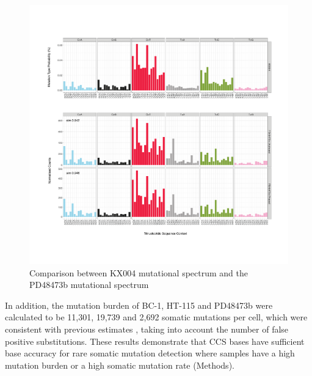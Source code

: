 \begin{figure}[htbp!]
\caption{Comparison between KX004 mutational spectrum and the PD48473b mutational spectrum}
\label{figure:PD48473b}
\includegraphics[width=\textwidth]{Vector/hg19.KX001.PD48473b.pdf}
\end{figure}

In addition, the mutation burden of BC-1, HT-115 and PD48473b were calculated to be 11,301,  19,739 and 2,692 somatic mutations per cell, which were consistent with previous estimates \cite{Mitchell2022-ry, Petljak2019-wi}, taking into account the number of false positive substitutions. These results demonstrate that CCS bases have sufficient base accuracy for rare somatic mutation detection where samples have a high mutation burden or a high somatic mutation rate (Methods). 


